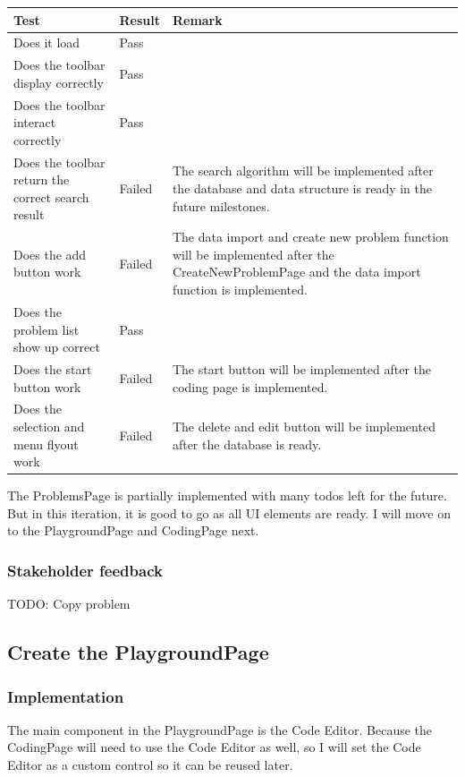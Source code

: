 \documentclass[a4paper]{report}
\begin{document}
\begin{tabulary}{\linewidth}{|L|l|L|}
    \hline
    Test & Result & Remark \\
    \hline
    Does it load & Pass & \\
    \hline
    Does the toolbar display correctly & Pass & \\
    \hline
    Does the toolbar interact correctly & Pass & \\
    \hline
    Does the toolbar return the correct search result & Failed & The search algorithm will be implemented after the database and data structure is ready in the future milestones. \\
    \hline
    Does the add button work & Failed & The data import and create new problem function will be implemented after the CreateNewProblemPage and the data import function is implemented. \\
    \hline
    Does the problem list show up correct & Pass & \\
    \hline
    Does the start button work & Failed & The start button will be implemented after the coding page is implemented. \\
    \hline
    Does the selection and menu flyout work & Failed & The delete and edit button will be implemented after the database is ready. \\
    \hline
\end{tabulary}

The ProblemsPage is partially implemented with many todos left for the future. But in this iteration, it is good to go as all UI elements are ready. I will move on to the PlaygroundPage and CodingPage next.

\subsubsection{Stakeholder feedback}

TODO: Copy problem

\subsection{Create the PlaygroundPage}

\subsubsection{Implementation}

The main component in the PlaygroundPage is the Code Editor. Because the CodingPage will need to use the Code Editor as well, so I will set the Code Editor as a custom control so it can be reused later.
\end{document}
